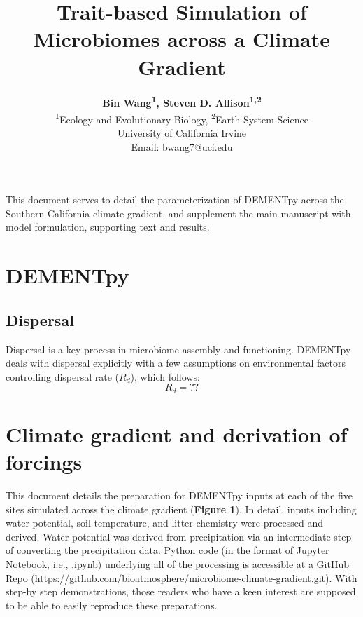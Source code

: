 \documentclass[letterpaper, 10pt]{article}
\begin{document}
\setlength{\droptitle}{-8em} 
\title{\Large\textbf{Trait-based Simulation of Microbiomes across a Climate Gradient}\vspace{-0em}}
\author{\normalsize\textbf{Bin Wang\textsuperscript{1}, Steven D. Allison\textsuperscript{1,2}}\vspace{1em} \\
\textsuperscript{1}Ecology and Evolutionary Biology, \textsuperscript{2}Earth System Science \\
University of California Irvine\vspace{0em} \\
Email: bwang7@uci.edu} 
\maketitle

This document serves to detail the parameterization of DEMENTpy across the Southern California
climate gradient, and supplement the main manuscript with model formulation, supporting text and results.

\section{DEMENTpy}

\subsection{Dispersal}
Dispersal is a key process in microbiome assembly and functioning. DEMENTpy deals with
dispersal explicitly with a few assumptions on environmental factors controlling dispersal rate ($R_{d}$),
which follows:
\begin{equation}
  R_{d} = ?? 
\end{equation}


\section{Climate gradient and derivation of forcings}
This document details the preparation for DEMENTpy inputs at each of the five sites simulated across the climate
gradient (\textbf{Figure 1}). In detail, inputs including water potential, soil temperature, and litter chemistry were
processed and derived. Water potential was derived from precipitation via an intermediate step of converting the
precipitation data. Python code (in the format of Jupyter Notebook, i.e., .ipynb) underlying all of the processing is
accessible at a GitHub Repo (\url{https://github.com/bioatmosphere/microbiome-climate-gradient.git}). With step-by
step demonstrations, those readers who have a keen interest are supposed to be able to easily reproduce these
preparations.
\end{document}
